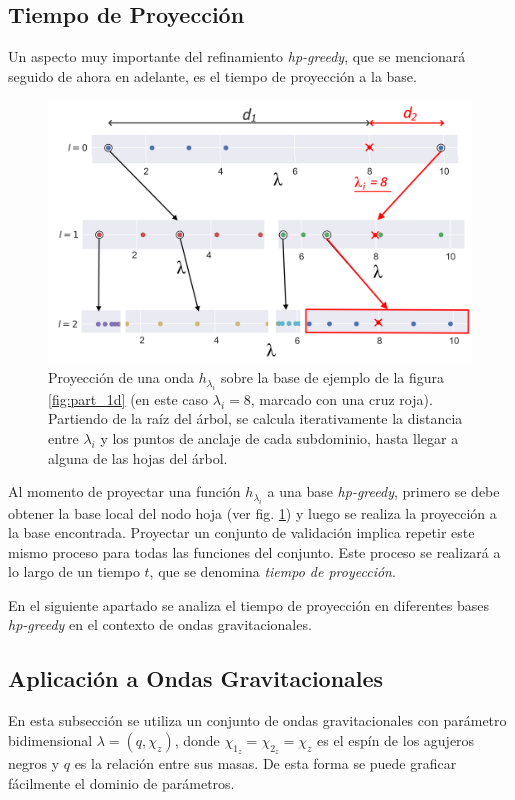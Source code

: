 \subsection{Tiempo de Proyección}


Un aspecto muy importante del refinamiento \textit{hp-greedy}, que se mencionará seguido de ahora en adelante, es el tiempo de proyección a la base. 


\begin{figure}[h!]
\centering
\includegraphics[width=0.75\columnwidth]{figs/proyeccion_1d.png}
\caption{Proyección de una onda $h_{\lambda_i}$ sobre la base de ejemplo de la figura \ref{fig:part_1d} (en este caso $\lambda_i = 8$, marcado con una cruz roja). Partiendo de la raíz del árbol, se calcula iterativamente la distancia entre $\lambda_i$ y los puntos de anclaje de cada subdominio, hasta llegar a alguna de las hojas del árbol.}
\label{fig:proy_1d}
\end{figure}

Al momento de proyectar una función $h_{\lambda_i}$ a una base \textit{hp-greedy}, primero se debe obtener la base local del nodo hoja (ver fig. \ref{fig:proy_1d}) y luego se realiza la proyección a la base encontrada.
Proyectar un conjunto de validación implica repetir este mismo proceso para todas las funciones del conjunto. Este proceso se realizará a lo largo de un tiempo $t$, que se denomina \textit{tiempo de proyección}. 

En el siguiente apartado se analiza el tiempo de proyección en diferentes bases \textit{hp-greedy} en el contexto de ondas gravitacionales.


\subsection{Aplicación a Ondas Gravitacionales}
\label{sec:hp-gw}

En esta subsección se utiliza un conjunto de ondas gravitacionales con parámetro bidimensional $\lambda = (q, \chi_z)$, donde $\chi_{1_z} = \chi_{2_z} = \chi_z$ es el espín de los agujeros negros y $q$ es la relación entre sus masas. De esta forma se puede graficar fácilmente el dominio de parámetros.



